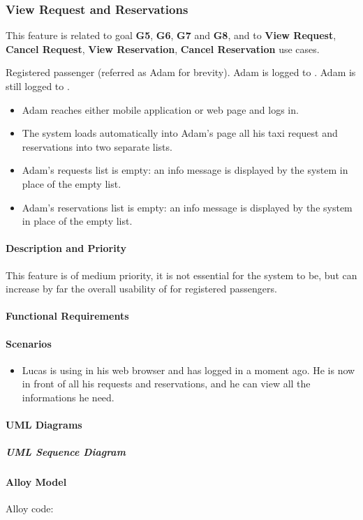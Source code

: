\subsubsection{View Request and Reservations}
This feature is related to goal \textbf{G5}, \textbf{G6}, \textbf{G7} and \textbf{G8}, and to \textbf{View Request}, \textbf{Cancel Request}, \textbf{View Reservation}, \textbf{Cancel Reservation} use cases.
\begin{itemize}
	 Registered passenger (referred as Adam for brevity).
	 Adam is logged to \myTaxiService{}.
	 Adam is still logged to \myTaxiService{}.
	\begin{itemize}
		\item Adam reaches either \myTaxiService{} mobile application or web page and logs in.
		\item The system loads automatically into Adam's page all his taxi request and reservations into two separate lists.
	\end{itemize}
	\begin{itemize}
		\item Adam's requests list is empty: an info message is displayed by the system in place of the empty list.
		\item Adam's reservations list is empty: an info message is displayed by the system in place of the empty list.
	\end{itemize}
\end{itemize}
\paragraph{Description and Priority}
This feature is of medium priority, it is not essential for the system to be, but can increase by far the overall usability of \myTaxiService{} for registered passengers.\par
\paragraph{Functional Requirements}
\begin{itemize}
\end{itemize}
\paragraph{Scenarios}
\begin{itemize}
	\item Lucas is using \myTaxiService{} in his web browser and has logged in a moment ago.
	He is now in front of all his requests and reservations, and he can view all the informations he need.
\end{itemize}
\paragraph{UML Diagrams}
\subparagraph{UML Sequence Diagram}
\paragraph{Alloy Model}
Alloy code: